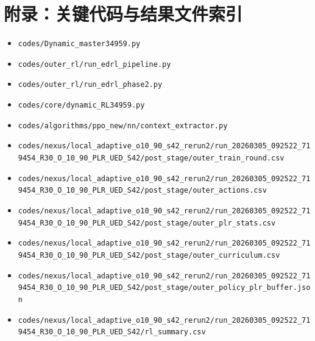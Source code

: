 \documentclass[11pt,a4paper]{ctexart}
\begin{document}
\section{附录：关键代码与结果文件索引}
\begin{itemize}[leftmargin=2.2em,itemsep=0.2em]
    \item \texttt{codes/Dynamic\_master34959.py}
    \item \texttt{codes/outer\_rl/run\_edrl\_pipeline.py}
    \item \texttt{codes/outer\_rl/run\_edrl\_phase2.py}
    \item \texttt{codes/core/dynamic\_RL34959.py}
    \item \texttt{codes/algorithms/ppo\_new/nn/context\_extractor.py}
    \item \texttt{codes/nexus/local\_adaptive\_o10\_90\_s42\_rerun2/run\_20260305\_092522\_719454\_R30\_O\_10\_90\_PLR\_UED\_S42/post\_stage/outer\_train\_round.csv}
    \item \texttt{codes/nexus/local\_adaptive\_o10\_90\_s42\_rerun2/run\_20260305\_092522\_719454\_R30\_O\_10\_90\_PLR\_UED\_S42/post\_stage/outer\_actions.csv}
    \item \texttt{codes/nexus/local\_adaptive\_o10\_90\_s42\_rerun2/run\_20260305\_092522\_719454\_R30\_O\_10\_90\_PLR\_UED\_S42/post\_stage/outer\_plr\_stats.csv}
    \item \texttt{codes/nexus/local\_adaptive\_o10\_90\_s42\_rerun2/run\_20260305\_092522\_719454\_R30\_O\_10\_90\_PLR\_UED\_S42/post\_stage/outer\_curriculum.csv}
    \item \texttt{codes/nexus/local\_adaptive\_o10\_90\_s42\_rerun2/run\_20260305\_092522\_719454\_R30\_O\_10\_90\_PLR\_UED\_S42/post\_stage/outer\_policy\_plr\_buffer.json}
    \item \texttt{codes/nexus/local\_adaptive\_o10\_90\_s42\_rerun2/run\_20260305\_092522\_719454\_R30\_O\_10\_90\_PLR\_UED\_S42/rl\_summary.csv}
\end{itemize}
\end{document}
